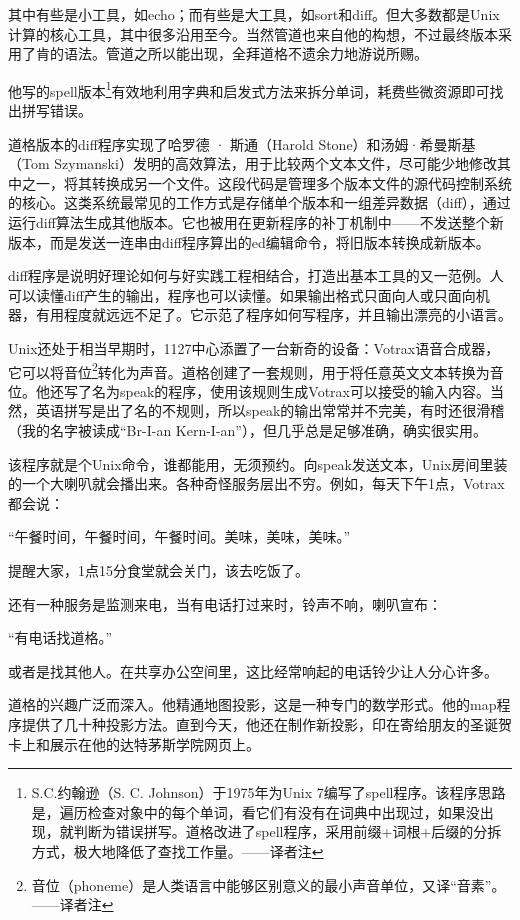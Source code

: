 \documentclass[a4paper,12pt,UTF8,twoside]{ctexbook}
\begin{document}
其中有些是小工具，如echo；而有些是大工具，如sort和diff。但大多数都是Unix计算的核心工具，其中很多沿用至今。当然管道也来自他的构想，不过最终版本采用了肯的语法。管道之所以能出现，全拜道格不遗余力地游说所赐。

他写的spell版本\footnote{S.C.约翰逊（S. C. Johnson）于1975年为Unix 7编写了spell程序。该程序思路是，遍历检查对象中的每个单词，看它们有没有在词典中出现过，如果没出现，就判断为错误拼写。道格改进了spell程序，采用前缀+词根+后缀的分拆方式，极大地降低了查找工作量。——译者注}有效地利用字典和启发式方法来拆分单词，耗费些微资源即可找出拼写错误。

道格版本的diff程序实现了哈罗德 · 斯通（Harold Stone）和汤姆·希曼斯基（Tom Szymanski）发明的高效算法，用于比较两个文本文件，尽可能少地修改其中之一，将其转换成另一个文件。这段代码是管理多个版本文件的源代码控制系统的核心。这类系统最常见的工作方式是存储单个版本和一组差异数据（diff），通过运行diff算法生成其他版本。它也被用在更新程序的补丁机制中——不发送整个新版本，而是发送一连串由diff程序算出的ed编辑命令，将旧版本转换成新版本。

diff程序是说明好理论如何与好实践工程相结合，打造出基本工具的又一范例。人可以读懂diff产生的输出，程序也可以读懂。如果输出格式只面向人或只面向机器，有用程度就远远不足了。它示范了程序如何写程序，并且输出漂亮的小语言。

Unix还处于相当早期时，1127中心添置了一台新奇的设备：Votrax语音合成器，它可以将音位\footnote{音位（phoneme）是人类语言中能够区别意义的最小声音单位，又译“音素”。——译者注}转化为声音。道格创建了一套规则，用于将任意英文文本转换为音位。他还写了名为speak的程序，使用该规则生成Votrax可以接受的输入内容。当然，英语拼写是出了名的不规则，所以speak的输出常常并不完美，有时还很滑稽（我的名字被读成“Br-I-an Kern-I-an”），但几乎总是足够准确，确实很实用。

该程序就是个Unix命令，谁都能用，无须预约。向speak发送文本，Unix房间里装的一个大喇叭就会播出来。各种奇怪服务层出不穷。例如，每天下午1点，Votrax都会说：

“午餐时间，午餐时间，午餐时间。美味，美味，美味。”

提醒大家，1点15分食堂就会关门，该去吃饭了。

还有一种服务是监测来电，当有电话打过来时，铃声不响，喇叭宣布：

“有电话找道格。”

或者是找其他人。在共享办公空间里，这比经常响起的电话铃少让人分心许多。

道格的兴趣广泛而深入。他精通地图投影，这是一种专门的数学形式。他的map程序提供了几十种投影方法。直到今天，他还在制作新投影，印在寄给朋友的圣诞贺卡上和展示在他的达特茅斯学院网页上。
\end{document}
